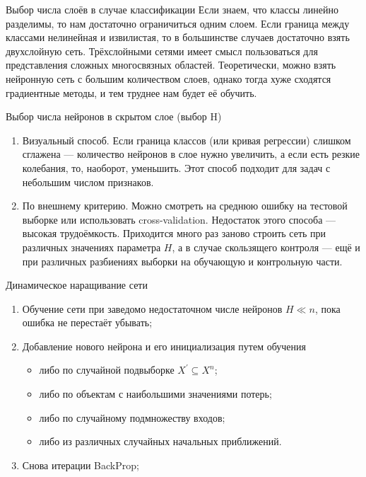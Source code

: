 \documentclass[11pt]{beamer}
\begin{document}
	\begin{frame}{Выбор числа слоёв в случае классификации} 
		Если знаем, что классы линейно разделимы, то нам достаточно ограничиться одним слоем. Если граница между классами нелинейная и извилистая, то в большинстве случаев достаточно взять двухслойную сеть. Трёхслойными сетями имеет смысл пользоваться для представления сложных многосвязных областей. Теоретически, можно взять нейронную сеть с большим количеством слоев, однако тогда хуже сходятся градиентные методы, и тем труднее нам будет её обучить.
	\end{frame}

	\begin{frame}{Выбор числа нейронов в скрытом слое (выбор H)}
		\begin{enumerate}
			\item Визуальный способ. Если граница классов (или кривая регрессии) слишком сглажена --- количество нейронов в слое нужно увеличить, а если есть резкие колебания, то, наоборот, уменьшить. Этот способ подходит для задач с небольшим числом признаков.
			\item По внешнему критерию. Можно смотреть на среднюю ошибку на тестовой выборке или использовать cross-validation. Недостаток этого способа --- высокая трудоёмкость. Приходится много раз заново строить сеть при различных значениях параметра $H$, а в случае скользящего контроля --- ещё и при различных разбиениях выборки на обучающую и контрольную части.
		\end{enumerate}
	\end{frame}

	\begin{frame}{Динамическое наращивание сети}
			\begin{enumerate}
			\item Обучение сети при заведомо недостаточном числе нейронов $H \ll n$, пока ошибка не перестаёт убывать;
			\item Добавление нового нейрона и его инициализация путем обучения 
			\begin{itemize}
				\item либо по случайной подвыборке $X^{'} \subseteq X^n$;
				\item либо по объектам с наибольшими значениями потерь;
				\item либо по случайному подмножеству входов;
				\item либо из различных случайных начальных приближений.
			\end{itemize}
			\item Снова итерации BackProp;
		\end{enumerate}
	\end{frame}
\end{document}
